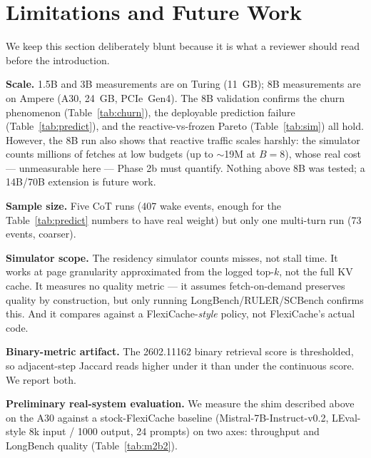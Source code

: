 \documentclass[11pt]{article}
\begin{document}
\section{Limitations and Future Work}
\label{sec:limits}

We keep this section deliberately blunt because it is what a reviewer
should read before the introduction.

\textbf{Scale.} 1.5B and 3B measurements are on Turing (11~GB);
8B measurements are on Ampere (A30, 24~GB, PCIe~Gen4). The 8B validation
confirms the churn phenomenon (Table~\ref{tab:churn}), the deployable
prediction failure (Table~\ref{tab:predict}), and the reactive-vs-frozen
Pareto (Table~\ref{tab:sim}) all hold. However, the 8B run also shows
that reactive traffic scales harshly: the simulator counts millions of
fetches at low budgets (up to $\sim$19M at $B{=}8$), whose real cost
--- unmeasurable here --- Phase 2b must quantify. Nothing above 8B was
tested; a 14B/70B extension is future work.

\textbf{Sample size.} Five CoT runs (407 wake events, enough for the
Table~\ref{tab:predict} numbers to have real weight) but only one
multi-turn run (73 events, coarser).

\textbf{Simulator scope.} The residency simulator counts misses, not
stall time. It works at page granularity approximated from the logged
top-$k$, not the full KV cache. It measures no quality metric --- it
assumes fetch-on-demand preserves quality by construction, but only
running LongBench/RULER/SCBench confirms this. And it compares
against a FlexiCache-\emph{style} policy, not FlexiCache's actual
code.

\textbf{Binary-metric artifact.} The 2602.11162 binary retrieval score
is thresholded, so adjacent-step Jaccard reads higher under it than
under the continuous score. We report both.

\textbf{Preliminary real-system evaluation.} We measure the shim
described above on the A30 against a stock-FlexiCache baseline
(Mistral-7B-Instruct-v0.2, LEval-style 8k input / 1000 output, 24
prompts) on two axes: throughput and LongBench quality
(Table~\ref{tab:m2b2}).
\end{document}
